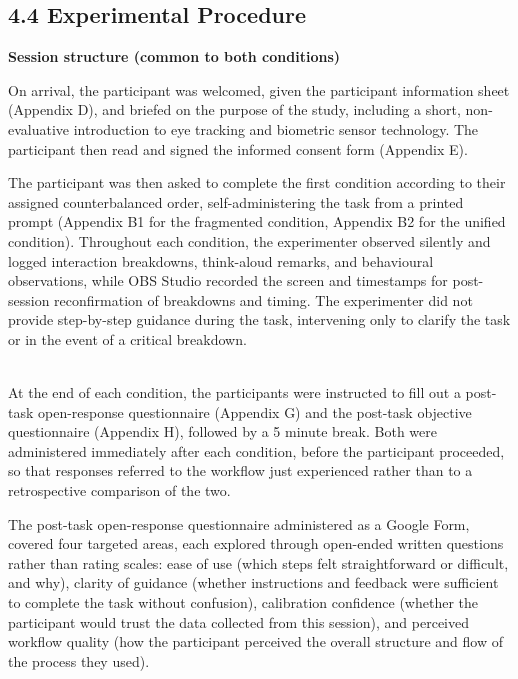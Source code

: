 \documentclass[
]{article}
\begin{document}
\hypertarget{experimental-procedure}{%
\subsection{4.4 Experimental Procedure}\label{experimental-procedure}}

\textbf{Session structure (common to both conditions)}

On arrival, the participant was welcomed, given the participant information sheet (Appendix D), and briefed on the purpose of the study, including a short, non-evaluative introduction to eye tracking and biometric sensor technology. The participant then read and signed the informed consent form (Appendix E).

The participant was then asked to complete the first condition according to their assigned counterbalanced order, self-administering the task from a printed prompt (Appendix B1 for the fragmented condition, Appendix B2 for the unified condition). Throughout each condition, the experimenter observed silently and logged interaction breakdowns, think-aloud remarks, and behavioural observations, while OBS Studio recorded the screen and timestamps for post-session reconfirmation of breakdowns and timing. The experimenter did not provide step-by-step guidance during the task, intervening only to clarify the task or in the event of a critical breakdown.\\
\strut \\
At the end of each condition, the participants were instructed to fill out a post-task open-response questionnaire (Appendix G) and the post-task objective questionnaire (Appendix H), followed by a 5 minute break. Both were administered immediately after each condition, before the participant proceeded, so that responses referred to the workflow just experienced rather than to a retrospective comparison of the two.

The post-task open-response questionnaire administered as a Google Form, covered four targeted areas, each explored through open-ended written questions rather than rating scales: ease of use (which steps felt straightforward or difficult, and why), clarity of guidance (whether instructions and feedback were sufficient to complete the task without confusion), calibration confidence (whether the participant would trust the data collected from this session), and perceived workflow quality (how the participant perceived the overall structure and flow of the process they used).
\end{document}
